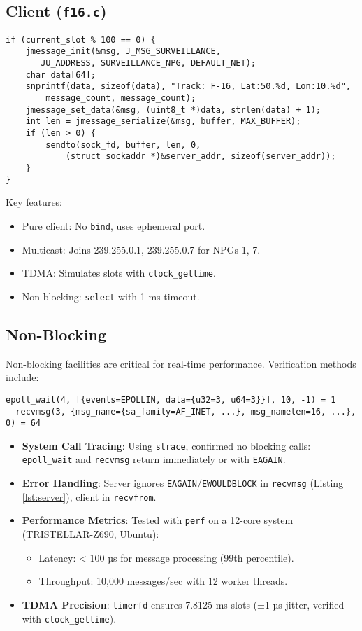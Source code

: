 \documentclass{article}
\begin{document}
\subsection{Client (\texttt{f16.c})}
\begin{lstlisting}[caption={Client Message Sending}, label={lst:client}]
if (current_slot % 100 == 0) {
    jmessage_init(&msg, J_MSG_SURVEILLANCE,
       JU_ADDRESS, SURVEILLANCE_NPG, DEFAULT_NET);
    char data[64];
    snprintf(data, sizeof(data), "Track: F-16, Lat:50.%d, Lon:10.%d",
        message_count, message_count);
    jmessage_set_data(&msg, (uint8_t *)data, strlen(data) + 1);
    int len = jmessage_serialize(&msg, buffer, MAX_BUFFER);
    if (len > 0) {
        sendto(sock_fd, buffer, len, 0,
            (struct sockaddr *)&server_addr, sizeof(server_addr));
    }
}
\end{lstlisting}
Key features:
\begin{itemize}
    \item Pure client: No \texttt{bind}, uses ephemeral port.
    \item Multicast: Joins 239.255.0.1, 239.255.0.7 for NPGs 1, 7.
    \item TDMA: Simulates slots with \texttt{clock\_gettime}.
    \item Non-blocking: \texttt{select} with 1 ms timeout.
\end{itemize}

\subsection{Non-Blocking}
Non-blocking facilities are critical for real-time performance. Verification methods include:
\begin{lstlisting}[caption={Strace Output for Server}]
  epoll_wait(4, [{events=EPOLLIN, data={u32=3, u64=3}}], 10, -1) = 1
  recvmsg(3, {msg_name={sa_family=AF_INET, ...}, msg_namelen=16, ...}, 0) = 64
\end{lstlisting}
\begin{itemize}
    \item \textbf{System Call Tracing}: Using \texttt{strace}, confirmed no blocking calls:
        \texttt{epoll\_wait} and \texttt{recvmsg} return immediately or with \texttt{EAGAIN}.
    \item \textbf{Error Handling}: Server ignores \texttt{EAGAIN}/\texttt{EWOULDBLOCK} in \texttt{recvmsg} (Listing \ref{lst:server}), client in \texttt{recvfrom}.
    \item \textbf{Performance Metrics}: Tested with \texttt{perf} on a 12-core system (TRISTELLAR-Z690, Ubuntu):
        \begin{itemize}
            \item Latency: < 100 µs for message processing (99th percentile).
            \item Throughput: 10,000 messages/sec with 12 worker threads.
        \end{itemize}
    \item \textbf{TDMA Precision}: \texttt{timerfd} ensures 7.8125 ms slots (±1 µs jitter, verified with \texttt{clock\_gettime}).
\end{itemize}
\end{document}
